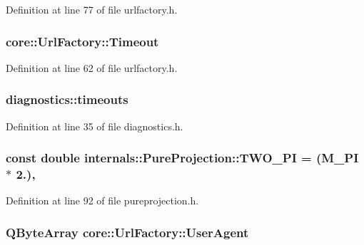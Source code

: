 Definition at line 77 of file urlfactory.\-h.

\hypertarget{group___o_p_map_widget_gaee21c04663fde2b41c6d471456dc7325}{
\subsubsection[{Timeout}]{ core\-::\-Url\-Factory\-::\-Timeout}}\label{group___o_p_map_widget_gaee21c04663fde2b41c6d471456dc7325}


Definition at line 62 of file urlfactory.\-h.

\hypertarget{group___o_p_map_widget_ga9f4f4d5bc0d01d665175028f4ea970c7}{
\subsubsection[{timeouts}]{ diagnostics\-::timeouts}}\label{group___o_p_map_widget_ga9f4f4d5bc0d01d665175028f4ea970c7}


Definition at line 35 of file diagnostics.\-h.

\hypertarget{group___o_p_map_widget_gac2ca007c6c6f6c095902daca2254d4bb}{
\subsubsection[{T\-W\-O\-\_\-\-P\-I}]{\setlength{\rightskip}{0pt plus 5cm}const {\bf double} internals\-::\-Pure\-Projection\-::\-T\-W\-O\-\_\-\-P\-I = (M\-\_\-\-P\-I $\ast$ 2.)\hspace{0.3cm}{\ttfamily [static]}, {\ttfamily [protected]}}}\label{group___o_p_map_widget_gac2ca007c6c6f6c095902daca2254d4bb}


Definition at line 92 of file pureprojection.\-h.

\hypertarget{group___o_p_map_widget_ga9dbf3d049cf1947db76a0c87dd0821fc}{
\subsubsection[{User\-Agent}]{\setlength{\rightskip}{0pt plus 5cm}Q\-Byte\-Array core\-::\-Url\-Factory\-::\-User\-Agent}}\label{group___o_p_map_widget_ga9dbf3d049cf1947db76a0c87dd0821fc}


